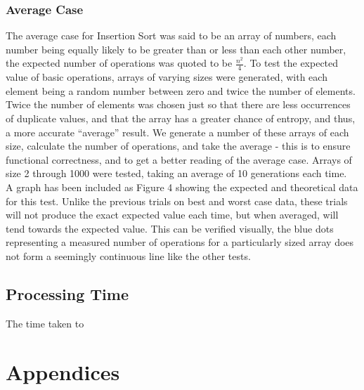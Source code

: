 \documentclass{article}
\begin{document}
        \subsubsection{Average Case}
            The average case for Insertion Sort was said to be an array of numbers, each number being equally likely to be greater than or less than each other number, the expected number of operations was quoted to be $\frac{n^2}{4}$. To test the expected value of basic operations, arrays of varying sizes were generated, with each element being a random number between zero and twice the number of elements. Twice the number of elements was chosen just so that there are less occurrences of duplicate values, and that the array has a greater chance of entropy, and thus, a more accurate ``average'' result. We generate a number of these arrays of each size, calculate the number of operations, and take the average - this is to ensure functional correctness, and to get a better reading of the average case. Arrays of size 2 through 1000 were tested, taking an average of 10 generations each time.\\

            A graph has been included as Figure 4 showing the expected and theoretical data for this test. Unlike the previous trials on best and worst case data, these trials will not produce the exact expected value each time, but when averaged, will tend towards the expected value. This can be verified visually, the blue dots representing a measured number of operations for a particularly sized array does not form a seemingly continuous line like the other tests.

    \subsection{Processing Time}
        The time taken to 

\section{Appendices}
\end{document}
